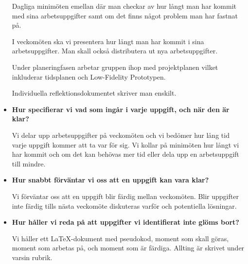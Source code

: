 \documentclass{liu_mall}
\begin{document}
\begin{itemize}
  Dagliga minimöten emellan där man checkar av hur långt man har kommit med sina arbetsuppgifter samt om det finns något problem man har fastnat på.
  
  I veckomöten ska vi presentera hur långt man har kommit i sina arbetsuppgifter. Man skall också distributera ut nya arbetsuppgifter.

  Under planeringfasen arbetar gruppen ihop med projektplanen vilket inkluderar tidsplanen och Low-Fidelity Prototypen.
  
  Individuella reflektionsdokumentet skriver man enskilt.

\item \textbf{Hur specifierar vi vad som ingår i varje uppgift, och när den är klar?}

  Vi delar upp arbetsuppgifter på veckomöten och vi bedömer hur lång tid varje uppgift kommer att ta var för sig. Vi kollar på minimöten hur långt vi har kommit och om det kan behövas mer tid eller dela upp en arbetsuppgift till mindre.

\item \textbf{Hur snabbt förväntar vi oss att en uppgift kan vara klar?}

  Vi förväntar oss att en uppgift blir färdig mellan veckomöten. Blir uppgifter inte färdig tills nästa veckomöte diskuteras varför och potentiella lösningar.

\item \textbf{Hur håller vi reda på att uppgifter vi identifierat inte glöms bort?}

  Vi håller ett LaTeX-dokument med pseudokod, moment som skall göras, moment som arbetas på, och moment som är färdiga. Allting är skrivet under varsin rubrik.

\end{itemize}
\end{document}
